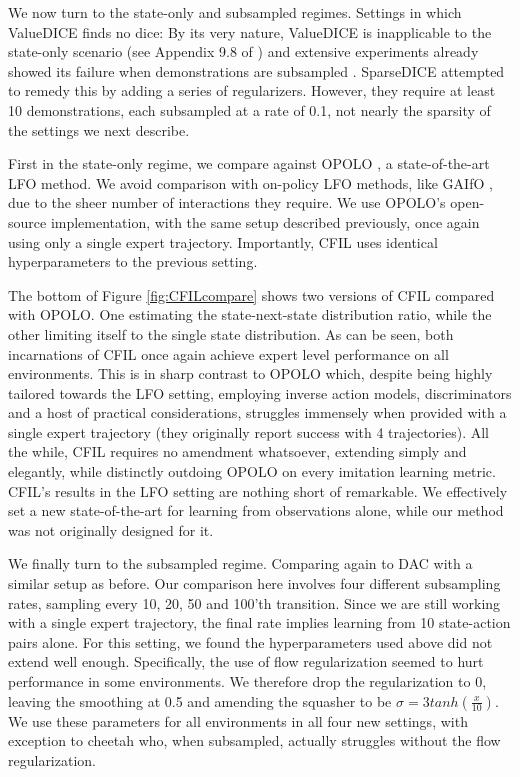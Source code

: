 We now turn to the state-only and subsampled regimes. Settings in which ValueDICE finds no dice: By its very nature, ValueDICE is inapplicable to the state-only scenario (see Appendix 9.8 of \cite{zhu2020off}) and extensive experiments already showed its failure when demonstrations are subsampled \cite{li2022rethinking}. SparseDICE \cite{camacho2021sparsedice} attempted to remedy this by adding a series of regularizers. However, they require at least 10 demonstrations, each subsampled at a rate of 0.1, not nearly the sparsity of the settings we next describe.

First in the state-only regime, we compare against OPOLO \cite{zhu2020off}, a state-of-the-art LFO method. We avoid comparison with on-policy LFO methods, like GAIfO \cite{torabi2018generative}, due to the sheer number of interactions they require. We use OPOLO's open-source implementation, with the same setup described previously, once again using only a single expert trajectory. Importantly, CFIL uses identical hyperparameters to the previous setting.


The bottom of Figure \ref{fig:CFILcompare} shows two versions of CFIL compared with OPOLO. One estimating the state-next-state distribution ratio, while the other limiting itself to the single state distribution. As can be seen, both incarnations of CFIL once again achieve expert level performance on all environments. This is in sharp contrast to OPOLO which, despite being highly tailored towards the LFO setting, employing inverse action models, discriminators and a host of practical considerations, struggles immensely when provided with a single expert trajectory (they originally report success with 4 trajectories). All the while, CFIL requires no amendment whatsoever, extending simply and elegantly, while distinctly outdoing OPOLO on every imitation learning metric. CFIL's results in the LFO setting are nothing short of remarkable. We effectively set a new state-of-the-art for learning from observations alone, while our method was not originally designed for it.

We finally turn to the subsampled regime. Comparing again to DAC with a similar setup as before. Our comparison here involves four different subsampling rates, sampling every 10, 20, 50 and 100'th transition. Since we are still working with a single expert trajectory, the final rate implies learning from 10 state-action pairs alone. For this setting, we found the hyperparameters used above did not extend well enough. Specifically, the use of flow regularization seemed to hurt performance in some environments. We therefore drop the regularization to 0, leaving the smoothing at 0.5 and amending the squasher to be $\sigma = 3 tanh(\frac{x}{10})$. We use these parameters for all environments in all four new settings, with exception to cheetah who, when subsampled, actually struggles without the flow regularization.

